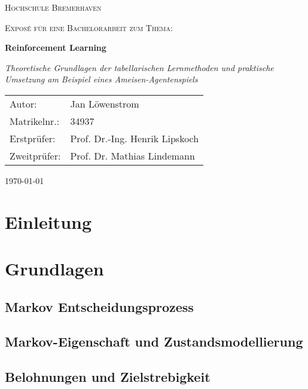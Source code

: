 \documentclass[12pt]{article}
\numberwithin{equation}{section}
\begin{document}
\begin{titlepage}
	\centering	
	{\scshape\LARGE Hochschule Bremerhaven \par}
	\vspace{1cm}
	{\scshape\Large Exposé für eine Bachelorarbeit zum Thema:\par}
	\vspace{1.5cm}
	{\huge\bfseries Reinforcement Learning\par}
	\vspace{2cm}
	{\Large\itshape Theoretische Grundlagen der tabellarischen Lernmethoden und praktische Umsetzung am Beispiel eines Ameisen-Agentenspiels
	\par}
	\vfill
	\begin{tabularx}{\textwidth}{lX}
		Autor: & Jan Löwenstrom \\
		Matrikelnr.: & 34937 \\
		Erstprüfer: & Prof. Dr.-Ing. Henrik Lipskoch \\
		Zweitprüfer: & Prof. Dr. Mathias Lindemann \\
	\end{tabularx}  
    \vfill

	{\large \today \par}       
\end{titlepage}

\tableofcontents
\pagebreak
\listoffigures
\newpage


\noindent
\section{Einleitung}


\pagebreak

\section{Grundlagen}
	
	\subsection{Markov Entscheidungsprozess}
	

	\subsection{Markov-Eigenschaft und Zustandsmodellierung}
	
	\pagebreak

	\subsection{Belohnungen und Zielstrebigkeit}
	
\end{document}
